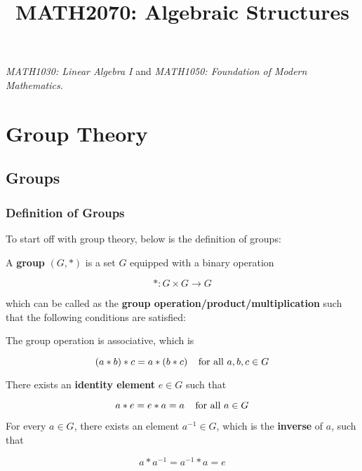 \documentclass[a4paper,12pt]{article}
\begin{document}
\title{MATH2070: Algebraic Structures}



\begin{prereq}
  \textit{MATH1030: Linear Algebra I} and \textit{MATH1050: Foundation of Modern Mathematics}.
\end{prereq}



\section{Group Theory}
\subsection{Groups}
\subsubsection{Definition of Groups}
To start off with group theory, below is the definition of groups:\n

\begin{dft}
  A \textbf{group} $(G,*)$ is a set $G$ equipped with a binary operation

  $$*:G\times G\rightarrow G$$\s

  which can be called as the \textbf{group operation/product/multiplication} such that the following conditions are satisfied:

  \begin{alist}
    \item The group operation is associative, which is

    $$(a*b)*c=a*(b*c)\;\;\;\;\text{for all }a,b,c\in G$$

    \item There exists an \textbf{identity element} $e\in G$ such that

    $$a*e=e*a=a\;\;\;\;\text{for all }a\in G$$

    \item For every $a\in G$, there exists an element $a^{-1}\in G$, which is the \textbf{inverse} of $a$, such that

    $$a*a^{-1}=a^{-1}*a=e$$
  \end{alist}
\end{dft}\n
\end{document}
